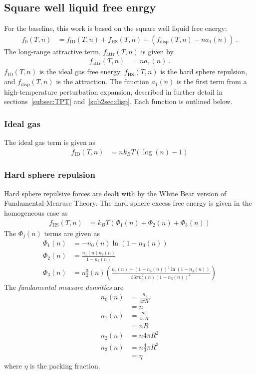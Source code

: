 \documentclass[letterpaper,twocolumn,amsmath,amssymb,prb]{revtex4-1}
\newcommand{\kT}{\ensuremath{k_BT}}
\newcommand{\fid}{\ensuremath{f_\text{ID}(T,n)}}
\newcommand{\fhs}{\ensuremath{f_\text{HS}(T,n)}}
\newcommand{\fdisp}{\ensuremath{f_\text{disp}(T,n)}}
\newcommand{\fattr}{\ensuremath{f_\text{attr}(T,n)}}
\newcommand{\1}{\ensuremath{\textbf{r}_1}}
\newcommand{\2}{\ensuremath{\textbf{r}_2}}
\newcommand{\3}{\ensuremath{\textbf{r}_3}}
\newcommand{\4}{\ensuremath{\textbf{r}_4}}
\begin{document}
\subsection{Square well liquid free enrgy}\label{subsec:SW}
For the baseline, this work is based on the square well liquid free energy:\cite{Hughes13}
\begin{align}
  f_0(T,n) &= \fid + \fhs + \left( \fdisp - n a_1(n) \right) \ .
\end{align}
The long-range attractive term, $\fattr$ is given by
\begin{align}
  \fattr &= n a_1(n) \ .
\end{align}
$\fid$ is the ideal gas free energy, $\fhs$ is the hard sphere
repulsion, and $\fdisp$ is the attraction. The function $a_1(n)$ is
the first term from a high-temperature perturbation expansion,
described in further detail in sections~\ref{subsec:TPT}
and~\ref{sub2sec:disp}. Each function is outlined below.

\subsubsection{Ideal gas}\label{sub2sec:ID}
The ideal gas term is given as
\begin{align}
  \fid &= n\kT\left(\log(n) - 1\right)
\end{align}

\subsubsection{Hard sphere repulsion}\label{sub2sec:HS}
Hard sphere repulsive forces are dealt with by the White Bear version
of Fundamental-Mearuse Theory.\cite{Roth02} The hard sphere excess
free energy is given in the homogeneous case as
\begin{align}
  \fhs &= \kT\left( \Phi_1(n) + \Phi_2(n) + \Phi_3(n) \right)
\end{align}
The $\Phi_j(n)$ terms are given as
\begin{align}
  \Phi_1(n) &= -n_0(n)\ln(1 - n_3(n)) \\
  \Phi_2(n) &= \frac{n_1(n)n_2(n)}{1 - n_3(n)} \\
  \Phi_3(n) &= n_2^3(n)\left( \frac{n_3(n) + (1 - n_3(n))^2\ln(1 - n_3(n))}{36\pi n_3^2(n)(1 - n_3(n))^2} \right)
\end{align}
The \emph{fundamental measure densities} are
\begin{align}
  n_0(n) &= \frac{n_2}{4\pi R^2} \nonumber \\
  &= n \\
  n_1(n) &= \frac{n_2}{4\pi R} \nonumber \\
  &= nR \\
  n_2(n) &= n4\pi R^2 \\
  n_3(n) &= n\frac{4}{3}\pi R^3 \nonumber \\
  &= \eta
\end{align}
where $\eta$ is the packing fraction.
\end{document}
